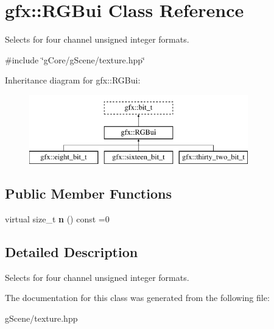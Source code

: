 \hypertarget{classgfx_1_1RGBui}{\section{gfx\-:\-:R\-G\-Bui Class Reference}
\label{classgfx_1_1RGBui}
}


Selects for four channel unsigned integer formats.  




{\ttfamily \#include \char`\"{}g\-Core/g\-Scene/texture.\-hpp\char`\"{}}

Inheritance diagram for gfx\-:\-:R\-G\-Bui\-:\begin{figure}[H]
\begin{center}
\leavevmode
\includegraphics[height=3.000000cm]{classgfx_1_1RGBui}
\end{center}
\end{figure}
\subsection*{Public Member Functions}
\begin{DoxyCompactItemize}
\item 
\hypertarget{classgfx_1_1RGBui_a7c9ef4a292cb08ee81a0cf4d32acb14c}{virtual size\-\_\-t {\bfseries n} () const =0}\label{classgfx_1_1RGBui_a7c9ef4a292cb08ee81a0cf4d32acb14c}

\end{DoxyCompactItemize}


\subsection{Detailed Description}
Selects for four channel unsigned integer formats. 

The documentation for this class was generated from the following file\-:\begin{DoxyCompactItemize}
\item 
g\-Scene/texture.\-hpp\end{DoxyCompactItemize}
